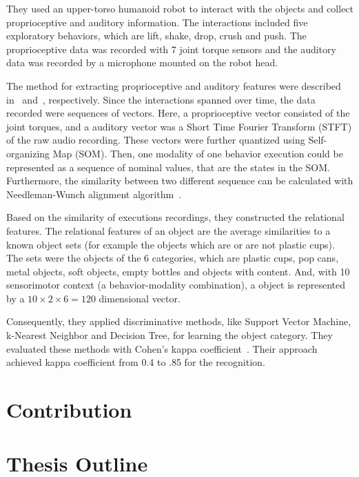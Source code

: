 \documentclass[12pt,final,twoside]{report}
\begin{document}
They used an upper-torso humanoid robot to interact with the objects and collect proprioceptive and auditory information. The interactions included five exploratory behaviors, which are lift, shake, drop, crush and push. The proprioceptive data was recorded with 7 joint torque sensors and the auditory data was recorded by a microphone mounted on the robot head.

The method for extracting proprioceptive and auditory features were described in~\cite{bergquist_interactive_2009} and~\cite{sinapov_interactive_2009}, respectively. Since the interactions spanned over time, the data recorded were sequences of vectors. Here, a proprioceptive vector consisted of the joint torques, and a auditory vector was a Short Time Fourier Transform (STFT) of the raw audio recording. These vectors were further quantized using Self-organizing Map (SOM). Then, one modality of one behavior execution could be represented as a sequence of nominal values, that are the states in the SOM. Furthermore, the similarity between two different sequence can be calculated with Needleman-Wunch alignment algorithm~\cite{needleman_general_1970}.

Based on the similarity of executions recordings, they constructed the relational features. The relational features of an object are the average similarities to a known object sets (for example the objects which are or are not plastic cups). The sets were the objects of the 6 categories, which are plastic cups, pop cans, metal objects, soft objects, empty bottles and objects with content. And, with 10 sensorimotor context (a behavior-modality combination), a object is represented by a $10 \times 2 \times 6 = 120$ dimensional vector.

Consequently, they applied discriminative methods, like Support Vector Machine, k-Nearest Neighbor and Decision Tree, for learning the object category. They evaluated these methods with Cohen's kappa coefficient~\cite{cohen_coefficient_1960}. Their approach achieved kappa coefficient from 0.4 to .85 for the recognition.

\section{Contribution}

\section{Thesis Outline}

\cleardoublepage
\end{document}
